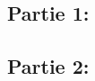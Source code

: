 \documentclass[11pt, french]{article}
\begin{document}
\subsection*{Partie 1:}

\subsection*{Partie 2:}

\end{document}
